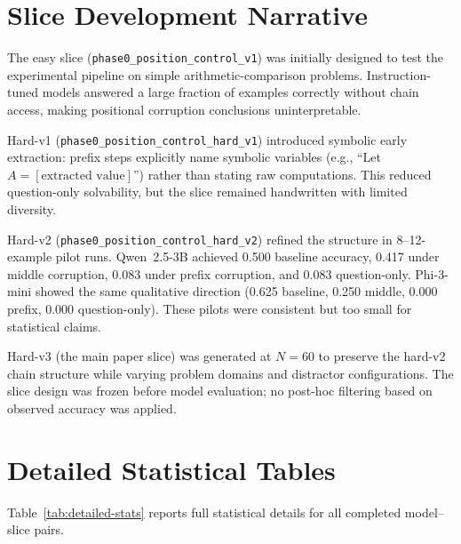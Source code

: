 \documentclass{article}
\theoremstyle{definition}
\theoremstyle{definition}
\begin{document}
\appendix
\section{Slice Development Narrative}
\label{appendix:dev}

The easy slice (\texttt{phase0\_position\_control\_v1}) was initially designed
to test the experimental pipeline on simple arithmetic-comparison problems.
Instruction-tuned models answered a large fraction of examples correctly
without chain access, making positional corruption conclusions uninterpretable.

Hard-v1 (\texttt{phase0\_position\_control\_hard\_v1}) introduced symbolic
early extraction: prefix steps explicitly name symbolic variables (e.g.,
``Let $A = [\text{extracted value}]$'') rather than stating raw computations.
This reduced question-only solvability, but the slice remained handwritten with
limited diversity.

Hard-v2 (\texttt{phase0\_position\_control\_hard\_v2}) refined the structure
in 8--12-example pilot runs. Qwen~2.5-3B achieved 0.500 baseline accuracy,
0.417 under middle corruption, 0.083 under prefix corruption, and 0.083
question-only. Phi-3-mini showed the same qualitative direction (0.625
baseline, 0.250 middle, 0.000 prefix, 0.000 question-only). These pilots were
consistent but too small for statistical claims.

Hard-v3 (the main paper slice) was generated at $N{=}60$ to preserve the
hard-v2 chain structure while varying problem domains and distractor
configurations. The slice design was frozen before model evaluation; no
post-hoc filtering based on observed accuracy was applied.

\section{Detailed Statistical Tables}
\label{appendix:stats}

Table~\ref{tab:detailed-stats} reports full statistical details for all
completed model--slice pairs.
\end{document}
